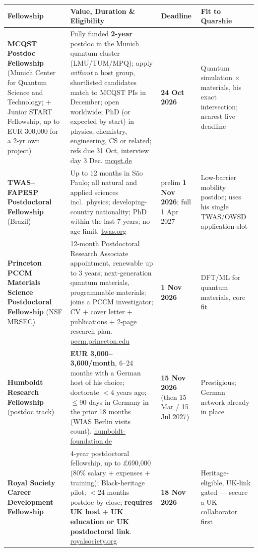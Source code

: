 \documentclass[11pt,a4paper]{article}
\begin{document}
\begin{longtable}{@{}p{3.3cm}p{5.6cm}p{2.2cm}p{2.8cm}@{}}
\toprule
\textbf{Fellowship} & \textbf{Value, Duration \& Eligibility} & \textbf{Deadline} & \textbf{Fit to Quarshie} \\
\midrule
\endhead
\textbf{MCQST Postdoc Fellowship} (Munich Center for Quantum Science and Technology; $+$ Junior START Fellowship, up to EUR 300{,}000 for a 2-yr own project) & Fully funded \textbf{2-year} postdoc in the Munich quantum cluster (LMU/TUM/MPQ); apply \emph{without} a host group, shortlisted candidates match to MCQST PIs in December; open worldwide; PhD (or expected by start) in physics, chemistry, engineering, CS or related; refs due 31 Oct, interview day 3 Dec. \href{https://www.mcqst.de/support/postdoctoral-programs/postdoc-fellowship.html}{mcqst.de} & \textbf{24 Oct 2026} & Quantum simulation $\times$ materials, his exact intersection; nearest live deadline \\
\midrule
\textbf{TWAS--FAPESP Postdoctoral Fellowship} (Brazil) & Up to 12 months in S\~ao Paulo; all natural and applied sciences incl.\ physics; developing-country nationality; PhD within the last 7 years; no age limit. \href{https://www.twas.org/opportunity/twas-fapesp-postdoctoral-fellowship-programme-developing-countries}{twas.org} & prelim \textbf{1 Nov 2026}; full 1 Apr 2027 & Low-barrier mobility postdoc; uses his single TWAS/OWSD application slot \\
\midrule
\textbf{Princeton PCCM Materials Science Postdoctoral Fellowship} (NSF MRSEC) & 12-month Postdoctoral Research Associate appointment, renewable up to 3 years; next-generation quantum materials, programmable materials; joins a PCCM investigator; CV $+$ cover letter $+$ publications $+$ 2-page research plan. \href{https://pccm.princeton.edu/education/postdoc-fellowship}{pccm.princeton.edu} & \textbf{1 Nov 2026} & DFT/ML for quantum materials, core fit \\
\midrule
\textbf{Humboldt Research Fellowship} (postdoc track) & \textbf{EUR 3{,}000--3{,}600/month}, 6--24 months with a German host of his choice; doctorate $<$4 years ago; $\leq$90 days in Germany in the prior 18 months (WIAS Berlin visits count). \href{https://www.humboldt-foundation.de/en/apply/sponsorship-programmes/humboldt-research-fellowship}{humboldt-foundation.de} & \textbf{15 Nov 2026} (then 15 Mar / 15 Jul 2027) & Prestigious; German network already in place \\
\midrule
\textbf{Royal Society Career Development Fellowship} & 4-year postdoctoral fellowship, up to \pounds690{,}000 (80\% salary $+$ expenses $+$ training); Black-heritage pilot; $<$24 months postdoc by close; \textbf{requires UK host $+$ UK education or UK postdoctoral link}. \href{https://royalsociety.org/grants/career-development-fellowship}{royalsociety.org} & \textbf{18 Nov 2026} & Heritage-eligible, UK-link gated --- secure a UK collaborator first \\

\end{longtable}
\end{document}
